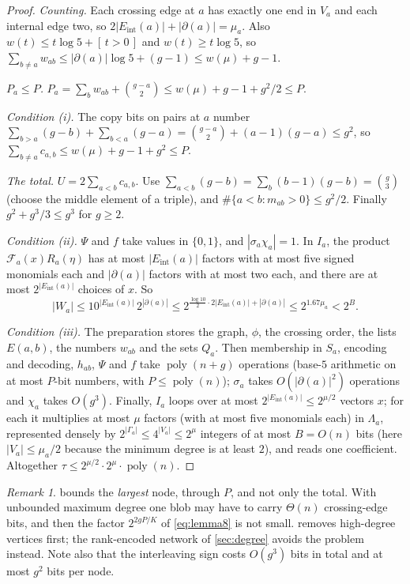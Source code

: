 \documentclass[11pt]{amsart}
\theoremstyle{plain}
\theoremstyle{definition}
\theoremstyle{remark}
\newtheorem{remark}[theorem]{Remark}
\numberwithin{equation}{section}
\newcommand{\cF}{\mathcal{F}}
\newcommand{\Eint}{E_{\mathrm{int}}}
\newcommand{\poly}{\operatorname{poly}}
\newcommand{\Ind}[1]{[\,#1\,]}
\begin{document}
\begin{proof}
\emph{Counting.} Each crossing edge at $a$ has exactly one end in $V_a$ and each internal edge
two, so $2|\Eint(a)|+|\partial(a)|=\mu_a$. Also $w(t)\le t\log5+\Ind{t>0}$ and $w(t)\ge t\log5$,
so $\sum_{b\ne a}w_{ab}\le|\partial(a)|\log5+(g-1)\le w(\mu)+g-1$.

\emph{$P_a\le P$.} $P_a=\sum_bw_{ab}+\binom{g-a}2\le w(\mu)+g-1+g^2/2\le P$.

\emph{Condition (i).} The copy bits on pairs at $a$ number
$\sum_{b>a}(g-b)+\sum_{b<a}(g-a)=\binom{g-a}2+(a-1)(g-a)\le g^2$, so $\sum_{b\ne a}c_{a,b}\le
w(\mu)+g-1+g^2\le P$.

\emph{The total.} $U=2\sum_{a<b}c_{a,b}$. Use $\sum_{a<b}(g-b)=\sum_b(b-1)(g-b)=\binom g3$ (choose
the middle element of a triple), and $\#\{a<b: m_{ab}>0\}\le g^2/2$. Finally $g^2+g^3/3\le g^3$ for
$g\ge2$.

\emph{Condition (ii).} $\Psi$ and $f$ take values in $\{0,1\}$, and $|\sigma_a\chi_a|=1$. In
$I_a$, the product $\cF_a(x)R_a(\eta)$ has at most $|\Eint(a)|$ factors with at most five signed
monomials each and $|\partial(a)|$ factors with at most two each, and there are at most
$2^{|\Eint(a)|}$ choices of $x$. So
\[
  |W_a|\le 10^{|\Eint(a)|}\,2^{|\partial(a)|}\le 2^{\frac{\log10}{2}\cdot2|\Eint(a)|+|\partial(a)|}
  \le 2^{1.67\mu_a}<2^B .
\]

\emph{Condition (iii).} The preparation stores the graph, $\phi$, the crossing order, the lists
$E(a,b)$, the numbers $w_{ab}$ and the sets $Q_a$. Then membership in $S_a$, encoding and
decoding, $h_{ab}$, $\Psi$ and $f$ take $\poly(n+g)$ operations (base-$5$ arithmetic on at most
$P$-bit numbers, with $P\le\poly(n)$); $\sigma_a$ takes $O(|\partial(a)|^2)$ operations and
$\chi_a$ takes $O(g^3)$. Finally, $I_a$ loops over at most $2^{|\Eint(a)|}\le2^{\mu/2}$ vectors
$x$; for each it multiplies at most $\mu$ factors (with at most five monomials each) in
$\Lambda_a$, represented densely by $2^{|\Gamma_a|}\le4^{|V_a|}\le2^\mu$ integers of at most
$B=O(n)$ bits (here $|V_a|\le\mu_a/2$ because the minimum degree is at least $2$), and reads one
coefficient. Altogether $\tau\le2^{\mu/2}\cdot2^\mu\cdot\poly(n)$.
\end{proof}

\begin{remark}\label{rem:largest-node}
 bounds the \emph{largest} node, through $P$, and not only the total. With
unbounded maximum degree one blob may have to carry $\Theta(n)$ crossing-edge bits, and then the
factor $2^{2gP/K}$ of \eqref{eq:lemma8} is not small.  removes high-degree
vertices first; the rank-encoded network of \cref{sec:degree} avoids the problem instead. Note also that the interleaving sign costs $O(g^3)$ bits in total and at most
$g^2$ bits per node.
\end{remark}
\end{document}
